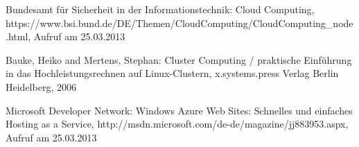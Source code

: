 \setcounter{page}{9}

\begin{thebibliography}{ABC12}
\thispagestyle{fancy}
 
Bundesamt für Sicherheit in der Informationstechnik: Cloud Computing, https://www.bsi.bund.de/DE/Themen/CloudComputing/CloudComputing\_node.html, Aufruf am 25.03.2013
 
 Bauke, Heiko and Mertens, Stephan: Cluster Computing / praktische Einführung in das Hochleistungsrechnen auf Linux-Clustern, x.systems.press Verlag Berlin Heidelberg, 2006 

Microsoft Developer Network: Windows Azure Web Sites: Schnelles und einfaches Hosting as a Service,  http://msdn.microsoft.com/de-de/magazine/jj883953.aspx, Aufruf am 25.03.2013

\end{thebibliography}
